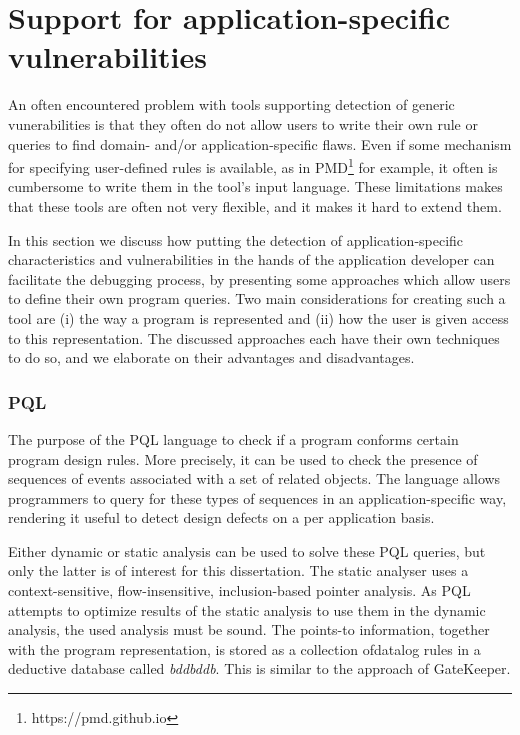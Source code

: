 \section{Support for application-specific vulnerabilities}
\label{sec:applicationSpecificVulnerabilities}

An often encountered problem with tools supporting detection of generic vunerabilities is that they often do not allow users to write their own rule or queries to find domain- and/or application-specific flaws. Even if some mechanism for specifying user-defined rules is available, as in PMD\footnote{https://pmd.github.io} for example, it often is cumbersome to write them in the tool's input language. These limitations makes that these tools are often not very flexible, and it makes it hard to extend them. 

In this section we discuss how putting the detection of application-specific characteristics and vulnerabilities in the hands of the application developer can facilitate the debugging process, by presenting some approaches which allow users to define their own program queries. Two main considerations for creating such a tool are (i) the way a program is represented and (ii) how the user is given access to this representation. The discussed approaches each have their own techniques to do so, and we elaborate on their advantages and disadvantages.


\subsubsection*{PQL}

The purpose of the PQL language to check if a program conforms certain program design rules\cite{PQL}. More precisely, it can be used to check the presence of sequences of events associated with a set of related objects. The language allows programmers to query for these types of sequences in an application-specific way, rendering it useful to detect design defects on a per application basis.

Either dynamic or static analysis can be used to solve these PQL queries, but only the latter is of interest for this dissertation. The static analyser uses a context-sensitive, flow-insensitive, inclusion-based pointer analysis. As PQL attempts to optimize results of the static analysis to use them in the dynamic analysis, the used analysis must be sound. The points-to information, together with the program representation, is stored as a collection ofdatalog rules in a deductive database called \textit{bddbddb}. This is similar to the approach of GateKeeper\cite{GateKeeper}.

